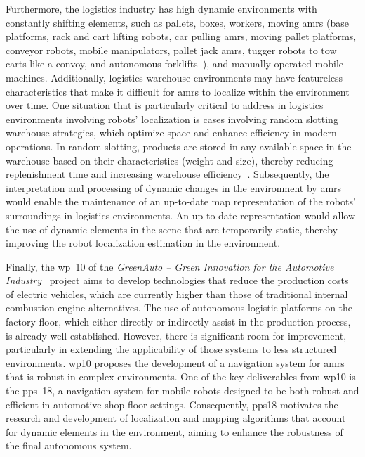 Furthermore, the logistics industry has high dynamic environments with
constantly shifting elements, such as pallets, boxes, workers,
moving \glspl{amr} (base platforms, rack and cart lifting robots,
car pulling \glspl{amr}, moving pallet platforms, conveyor robots,
mobile manipulators, pallet jack \glspl{amr}, tugger robots to tow carts like a
convoy, and autonomous forklifts~\cite{pastor:agv-network}),
and manually operated mobile machines.
Additionally, logistics warehouse environments may have featureless
characteristics that make it difficult for \glspl{amr} to localize within the
environment over time.
One situation that is particularly critical to address in logistics
environments involving robots' localization is cases involving random slotting
warehouse strategies, which optimize space and enhance efficiency in modern
operations.
In random slotting, products are stored in any available space in the warehouse
based on their characteristics (weight and size), thereby reducing replenishment
time and increasing warehouse efficiency~\cite{cisneros:qmh:2025}.
Subsequently, the interpretation and processing of dynamic changes in the
environment by \glspl{amr} would enable the maintenance of an up-to-date map
representation of the robots' surroundings in logistics environments.
An up-to-date representation would allow the use of dynamic elements in the
scene that are temporarily static, thereby improving the robot localization
estimation in the environment.

Finally, the \gls{wp}~10 of the
\textit{GreenAuto -- Green Innovation for the Automotive Industry}~\cite{greenauto}
project aims to develop technologies that reduce the production costs of
electric vehicles, which are currently higher than those of
traditional internal combustion engine alternatives.
The use of autonomous logistic platforms on the factory floor,
which either directly or indirectly assist in the production process,
is already well established.
However, there is significant room for improvement, particularly in
extending the applicability of those systems to less structured environments.
\gls{wp}10 proposes the development of a navigation system for \glspl{amr}
that is robust in complex environments. One of the key deliverables from
\gls{wp}10 is the \gls{pps}~18, a navigation system for mobile robots
designed to be both robust and efficient in automotive shop floor settings.
Consequently, \gls{pps}18 motivates the research and development of
localization and mapping algorithms that account for dynamic elements
in the environment, aiming to enhance the robustness of the final autonomous system.


